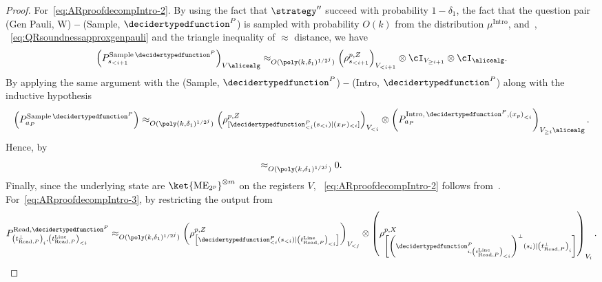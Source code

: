 \begin{proof}
 	For~\eqref{eq:ARproofdecompIntro-2}. By using the fact that $\strategy''$ succeed with probability $1 - \delta_1$, the fact that the question pair (Gen Pauli, W) \textbf{--} (Sample, $\decidertypedfunction^P$) is sampled with probability $O(k)$ from the distribution $\mu^{\text{Intro}}$, and~, ~\eqref{eq:QRsoundnessapproxgenpauli} and the triangle inequality of $\approx$ distance, we have
	\begin{equation}
		\left(P^{\text{Sample} \, \decidertypedfunction^P}_{s_{< i+1}} \right)_{V \alicealg} \approx_{O(\poly(k, \delta_1)^{1/2^j})} \left(\rho^{p, Z}_{s_{< i+1}} \right)_{V_{< i+1}} \otimes \cI_{V_{\geq i+1}} \otimes \cI_{\alicealg}.
	\end{equation}
	By applying the same argument with the (Sample, $\decidertypedfunction^P$) \textbf{--}  (Intro, $\decidertypedfunction^P$) along with the inductive hypothesis
	\begin{equation}
		\left(P^{\text{Sample} \, \decidertypedfunction^P}_{a_P} \right) \approx_{O(\poly(k, \delta_1)^{1/2^j})} \left(\rho^{p,Z}_{[\decidertypedfunction^P_{< i}(s_{< i})|(x_P)_{< i} ]}\right)_{V_{< i}} \otimes \left(P^{\text{Intro}, \, \decidertypedfunction^P, \left(x_p\right)_{< i}}_{a_P} \right)_{V_{\geq i} \alicealg}.
	\end{equation}	
	Hence, by~
	\begin{equation*}
		[\left(\rho^{p, Z}_{s_{< i+1}} \right)_{V_{< i+1}} \otimes \cI_{V_{\geq i+1}} \otimes \cI_{\alicealg}, \left(\rho^{p,Z}_{[\decidertypedfunction^P_{< i}(s_{< i})|(x_P)_{< i} ]}\right)_{V_{< i}} \otimes \left(P^{\text{Intro}, \, \decidertypedfunction^P, \left(x_p\right)_{< i}}_{a_P} \right)_{V_{\geq i} \alicealg}] \approx_{O(\poly(k, \delta_1)^{1/2^j})} 0.
	\end{equation*}
	Finally, since the underlying state are $\ket{\text{ME}_{2^p}}^{\otimes m}$ on the registers $V$, ~\eqref{eq:ARproofdecompIntro-2} follows from~. For~\eqref{eq:ARproofdecompIntro-3}, by restricting the output from~
	\begin{equation*}	
		 P^{\text{Read}, \decidertypedfunction^P}_{\left(t_{\text{Read}, P}^{\bot}\right)_{i}, \left(t_{\text{Read}, P}^{\text{Line}}\right)_{< i}} \approx_{O(\poly(k, \delta_1)^{1/2^j})}  \left(\rho^{p,Z}_{\left[\decidertypedfunction^P_{< i}(s_{< i})| \left(t_{\text{Read}, P}^{\text{Line}}\right)_{< i} \right]}\right)_{V_{< j}}  \otimes \left(\rho_{\left[\left(\decidertypedfunction_{i,  \left(t_{\text{Read}, P}^{\text{Line}}\right)_{< i}}^{P}\right)^{\bot} (s_i)| \left(t_{\text{Read}, P}^{\bot}\right)_{i} \right]}^{p, X}\right)_{V_i}.

\end{equation*}
\end{proof}
